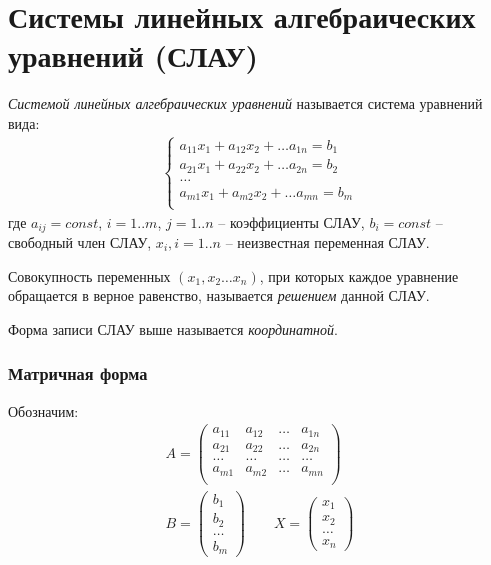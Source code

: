 \section{Системы линейных алгебраических уравнений (СЛАУ)}

\begin{definition}
  \textit{Системой линейных алгебраических уравнений} называется система уравнений вида:
  \begin{gather*}
    \begin{cases}
      a_{11} x_1  + a_{12} x_2 + \ldots a_{1n} = b_1 \\
      a_{21} x_1  + a_{22} x_2 + \ldots a_{2n} = b_2 \\
      \ldots \\
      a_{m1} x_1  + a_{m2} x_2 + \ldots a_{mn} = b_m \\
    \end{cases}
  \end{gather*}
  где $a_{ij} = const$, $i=1..m$, $j=1..n$ -- коэффициенты СЛАУ, $b_i = const$ -- свободный член СЛАУ,  $x_{i}, i=1..n$ -- неизвестная переменная СЛАУ.
\end{definition}

\begin{definition}
  Совокупность переменных $(x_1, x_2 \ldots x_{n})$, при которых каждое уравнение обращается в верное равенство, называется \textit{решением} данной СЛАУ. 
\end{definition}

Форма записи СЛАУ выше называется \textit{координатной}. 

\subsubsection*{Матричная форма}

Обозначим:
\begin{gather*}
  A = \left( 
\begin{matrix}
  a_{11} & a_{12} & \ldots & a_{1n} \\
  a_{21} & a_{22} & \ldots & a_{2n} \\
  \ldots & \ldots & \ldots & \ldots \\
  a_{m1} & a_{m2} & \ldots & a_{mn} \\
\end{matrix}
  \right) \\
  B = \left( 
    \begin{matrix}
      b_1 \\
      b_2 \\
      \ldots \\
      b_m
    \end{matrix}
  \right) \qquad
  X = \left( 
  \begin{matrix}
    x_1 \\
    x_2 \\
    \ldots \\
    x_n
  \end{matrix}
  \right) 
\end{gather*}


